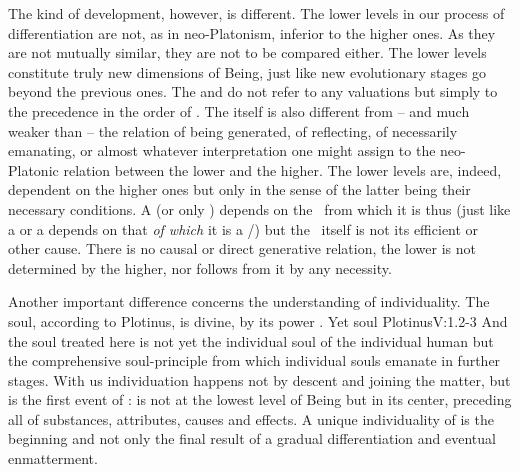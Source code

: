 The kind of development, however, is different. The lower levels in our process
of differentiation are not, as in neo-Platonism, inferior to the higher ones. As
they are not mutually similar, they are not to be compared either.  The lower
levels constitute truly new dimensions of Being, just like new evolutionary
stages go beyond the previous ones. The  and  do not refer
to any valuations but simply to the precedence in the order of .
The  itself is also different from -- and much weaker than -- the
relation of being generated, of reflecting, of necessarily emanating, or almost
whatever interpretation one might assign to the neo-Platonic relation between
the lower and the higher.  The lower levels are, indeed, dependent on the higher
ones but only in the sense of the latter being their necessary conditions.
A  (or only )  depends on
the \nexus\ from which it is thus  (just like a  or a
 depends on that {\em of which} it is a /) but the
\nexus\ itself is not its efficient or other cause.  There is no causal or
direct generative relation, the lower is not determined by the higher, nor
follows from it by any necessity.



\pa Another important difference concerns the understanding of
  individuality. The soul, according to Plotinus, is divine, by its power
  .
Yet soul \citet{for all the worth we have shown to belong to it, is yet a
  secondary, an image of the Intellectual-Principle.}{Plotinus}{V:1.2-3} And
the soul treated here is not yet the individual soul of the individual human but
the comprehensive soul-principle from which individual souls emanate in further
stages.  With us individuation happens not by descent and joining the matter,
but is the first event of :  is not at the lowest
level of Being but in its center, preceding all  of substances,
attributes, causes and effects. A unique individuality of  is the
beginning and not only the final result of a gradual differentiation and
eventual enmatterment.

